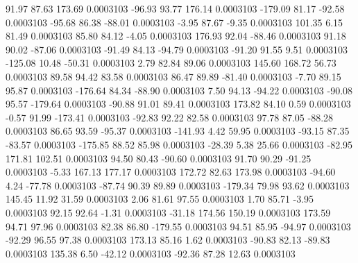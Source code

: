        91.97       87.63      173.69     0.0003103
      -96.93       93.77      176.14     0.0003103
     -179.09       81.17      -92.58     0.0003103
      -95.68       86.38      -88.01     0.0003103
       -3.95       87.67       -9.35     0.0003103
      101.35        6.15       81.49     0.0003103
       85.80       84.12       -4.05     0.0003103
      176.93       92.04      -88.46     0.0003103
       91.18       90.02      -87.06     0.0003103
      -91.49       84.13      -94.79     0.0003103
      -91.20       91.55        9.51     0.0003103
     -125.08       10.48      -50.31     0.0003103
        2.79       82.84       89.06     0.0003103
      145.60      168.72       56.73     0.0003103
       89.58       94.42       83.58     0.0003103
       86.47       89.89      -81.40     0.0003103
       -7.70       89.15       95.87     0.0003103
     -176.64       84.34      -88.90     0.0003103
        7.50       94.13      -94.22     0.0003103
      -90.08       95.57     -179.64     0.0003103
      -90.88       91.01       89.41     0.0003103
      173.82       84.10        0.59     0.0003103
       -0.57       91.99     -173.41     0.0003103
      -92.83       92.22       82.58     0.0003103
       97.78       87.05      -88.28     0.0003103
       86.65       93.59      -95.37     0.0003103
     -141.93        4.42       59.95     0.0003103
      -93.15       87.35      -83.57     0.0003103
     -175.85       88.52       85.98     0.0003103
      -28.39        5.38       25.66     0.0003103
      -82.95      171.81      102.51     0.0003103
       94.50       80.43      -90.60     0.0003103
       91.70       90.29      -91.25     0.0003103
       -5.33      167.13      177.17     0.0003103
      172.72       82.63      173.98     0.0003103
      -94.60        4.24      -77.78     0.0003103
      -87.74       90.39       89.89     0.0003103
     -179.34       79.98       93.62     0.0003103
      145.45       11.92       31.59     0.0003103
        2.06       81.61       97.55     0.0003103
        1.70       85.71       -3.95     0.0003103
       92.15       92.64       -1.31     0.0003103
      -31.18      174.56      150.19     0.0003103
      173.59       94.71       97.96     0.0003103
       82.38       86.80     -179.55     0.0003103
       94.51       85.95      -94.97     0.0003103
      -92.29       96.55       97.38     0.0003103
      173.13       85.16        1.62     0.0003103
      -90.83       82.13      -89.83     0.0003103
      135.38        6.50      -42.12     0.0003103
      -92.36       87.28       12.63     0.0003103
